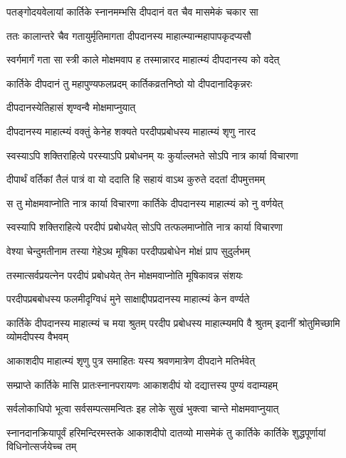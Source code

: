 \twolineshloka
{पतङ्गोदयवेलायां कार्तिके स्नानमम्भसि}
{दीपदानं वत चैव मासमेकं चकार सा} %

\twolineshloka
{ततः कालान्तरे चैव गतायुर्मृतिमागता}
{दीपदानस्य माहात्म्यान्महापापकृदप्यसौ} %

\twolineshloka
{स्वर्गमार्गं गता सा स्त्री काले मोक्षमवाप ह}
{तस्मान्नारद माहात्म्यं दीपदानस्य को वदेत्} %

\twolineshloka
{कार्तिके दीपदानं तु महापुण्यफलप्रदम्}
{कार्तिकव्रतनिष्ठो यो दीपदानादिकृन्नरः} %


\onelineshloka
{दीपदानस्येतिहासं शृण्वन्वै मोक्षमाप्नुयात्} %

\twolineshloka
{दीपदानस्य माहात्म्यं वक्तुं केनेह शक्यते}
{परदीपप्रबोधस्य माहात्म्यं शृणु नारद} %

\twolineshloka
{स्वस्याऽपि शक्तिराहित्ये परस्याऽपि प्रबोधनम्}
{यः कुर्याल्लभते सोऽपि नात्र कार्या विचारणा} %

\twolineshloka
{दीपार्थं वर्तिकां तैलं पात्रं वा यो ददाति हि}
{सहायं वाऽथ कुरुते ददतां दीपमुत्तमम्} %

\twolineshloka
{स तु मोक्षमवाप्नोति नात्र कार्या विचारणा}
{कार्तिके दीपदानस्य माहात्म्यं को नु वर्णयेत्} %

\twolineshloka
{स्वस्यापि शक्तिराहित्ये परदीपं प्रबोधयेत्}
{सोऽपि तत्फलमाप्नोति नात्र कार्या विचारणा} %

\twolineshloka
{वेश्या चेन्दुमतीनाम तस्या गेहेऽथ मूषिका}
{परदीपप्रबोधेन मोक्षं प्राप सुदुर्लभम्} %

\twolineshloka
{तस्मात्सर्वप्रयत्नेन परदीपं प्रबोधयेत्}
{तेन मोक्षमवाप्नोति मूषिकावन्न संशयः} %

\twolineshloka
{परदीपप्रबबोधस्य फलमीदृग्विधं मुने}
{साक्षाद्दीपप्रदानस्य माहात्म्यं केन वर्ण्यते} %


\threelineshloka
{कार्तिके दीपदानस्य माहात्म्यं च मया श्रुतम्}
{परदीप प्रबोधस्य माहात्म्यमपि वै श्रुतम्}
{इदानीं श्रोतुमिच्छामि व्योमदीपस्य वैभवम्} %


\twolineshloka
{आकाशदीप माहात्म्यं शृणु पुत्र समाहितः}
{यस्य श्रवणमात्रेण दीपदाने मतिर्भवेत्} %

\twolineshloka
{सम्प्राप्ते कार्तिके मासि प्रातःस्नानपरायणः}
{आकाशदीपं यो दद्यात्तस्य पुण्यं वदाम्यहम्} %

\twolineshloka
{सर्वलोकाधिपो भूत्वा सर्वसम्पत्समन्वितः}
{इह लोके सुखं भुक्त्वा चान्ते मोक्षमवाप्नुयात्} %

\threelineshloka
{स्नानदानक्रियापूर्वं हरिमन्दिरमस्तके}
{आकाशदीपो दातव्यो मासमेकं तु कार्तिके}
{कार्तिके शुद्धपूर्णायां विधिनोत्सर्जयेच्च तम्} %

